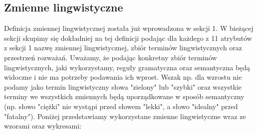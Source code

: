 \documentclass{classrep}
\begin{document}
\subsection{Zmienne lingwistyczne}
Definicja zmiennej lingwistycznej została już wprowadzona w sekcji 1. W bieżącej sekcji skupimy się dokładniej na tej definicji podając dla każdego z 11 atrybutów z sekcji 1 nazwę zmiennej lingwistycznej, zbiór terminów lingwistycznych oraz przestrzeń rozważań. Uważamy, że podając konkretny zbiór terminów lingwistycznych, jaki wykorzystamy, reguły gramatyczna oraz semantyczna będą widoczne i nie ma potrzeby podawania ich wprost. Wszak np. dla wzrostu nie podamy jako termin lingwistyczny słowa "zielony" lub "szybki" oraz wszystkie terminy we wszystkich zmiennych będą uporządkowane w sposób semantyczny (np. słowo "ciężki" nie wystąpi przed słowem "lekki", a słowo "idealny" przed "fatalny"). Poniżej przedstawiamy wykorzystane zmienne lingwistyczne wraz ze wzorami oraz wykresami:
\end{document}
